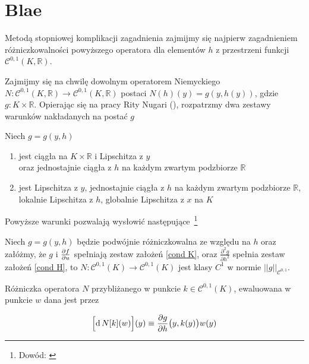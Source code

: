 \section*{Blae}


Metodą stopniowej komplikacji zagadnienia zajmijmy się najpierw zagadnieniem różniczkowalności powyższego operatora dla elementów $ h $ z przestrzeni funkcji $ \mathcal{C}^{0,1}(K, \mathbb{R}) $. 

Zajmijmy się na chwilę dowolnym operatorem Niemyckiego $ N : \mathcal{C}^{0,1}(K, \mathbb{R}) \rightarrow \mathcal{C}^{0,1}(K, \mathbb{R}) $ postaci $ N(h)(y) = g(y, h(y))$, gdzie $ g: K \times \mathbb{R} $. Opierając się na pracy Rity Nugari (\citeyear{Nugari1}), rozpatrzmy dwa zestawy warunków nakładanych na postać $ g $

\begin{ass}
Niech $ g = g(y, h) $ 
\begin{enumerate}
	\item{\label{cond H} jest ciągła na $ K \times \mathbb{R} $ i Lipschitza z $y$\\ oraz jednostajnie ciągła z $ h $ na każdym zwartym podzbiorze $ \mathbb{R} $}
	\item{\label{cond K} jest Lipschitza z $ y $, jednostajnie ciągła z $ h $ na każdym zwartym podzbiorze $ \mathbb{R} $, \\ lokalnie Lipschitza z $ h $, globalnie Lipschitza z $ x $ na $ K $  }
\end{enumerate}
\end{ass}

Powyższe warunki pozwalają wysłowić następujące~\footnote{Dowód: \citet[][str. 94]{Nugari1}}

\begin{tw}[O różniczkowalności nieautonomicznego~\footnote{Nomenklatura pochodzi z równań różniczkowych: $ w' =g(t,u(t)) $ to równanie nieautonomiczne, $ w'=g(u(t)) $ to równanie autonomiczne} operatora Niemyckiego]\label{Diff Nugari}

	Niech $ g = g(y, h) $ będzie podwójnie różniczkowalna ze względu na $ h $ oraz załóżmy, że $ g $ i $ \frac{\partial f}{\partial u}$ spełniają zestaw założeń \ref{cond K}, oraz $ \frac{\partial^{2} g }{\partial h^2} $ spełnia zestaw założeń \ref{cond H}, to $ N: \mathcal{C}^{0,1}(K) \rightarrow \mathcal{C}^{0,1}(K) $ jest klasy $ C^{1} $ w normie $ ||g||_{\mathcal{C}^{0,1}}$. 
	
Różniczka operatora $ N $ przybliżanego w punkcie $ k \in \mathcal{C}^{0,1}(K) $, ewaluowana w punkcie $ w $ dana jest przez

$$ \Bigl[\mathrm{d}\, N[k](w)\Bigl] (y) \equiv \frac{\partial g}{\partial h}\bigl(y, k(y)\bigl)w(y)   $$
\end{tw}

